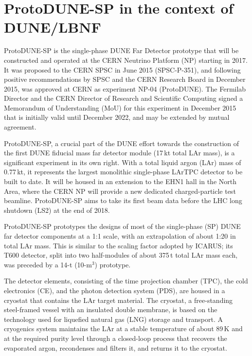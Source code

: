 
\section{ProtoDUNE-SP in the context of DUNE/LBNF}

ProtoDUNE-SP is the single-phase DUNE Far Detector prototype that will be constructed and operated at the CERN Neutrino Platform (NP) starting in 2017. It was proposed to the CERN SPSC in June 2015 (SPSC-P-351), and following positive recommendations by SPSC and the CERN Research Board in December 2015, was approved at CERN as experiment NP-04 (ProtoDUNE). The Fermilab Director and the CERN Director of Research and Scientific Computing signed a Memorandum of Understanding (MoU) for this experiment in December 2015 that is initially valid until December 2022, 
and may be extended by mutual agreement. 

ProtoDUNE-SP, a crucial part of the DUNE effort towards the construction of the first DUNE  fiducial mass far detector module (17\,kt total LAr mass), is a significant experiment in its own right. With a total liquid argon (LAr) mass of 0.77\,kt, it represents the largest monolithic single-phase LArTPC detector to be built to date.  
It will be housed in an extension to the EHN1 hall in the North Area, where the CERN NP will provide a new dedicated charged-particle test beamline. ProtoDUNE-SP aims to take its first beam data before the LHC long shutdown (LS2) at the end of 2018.

ProtoDUNE-SP prototypes the designs of most of the single-phase (SP) DUNE far detector components at a 1:1 scale, with an extrapolation of about 1:20 in total LAr mass. This is similar to the scaling factor adopted 
by ICARUS; its T600 detector, split into two half-modules of about 375\,t total LAr mass each, was preceded by a 14-t (10-m$^3$) prototype. 

The detector elements, consisting of the time projection chamber (TPC), the cold electronics (CE), and the photon detection system (PDS), are housed in a cryostat that contains the LAr target material. The cryostat, a free-standing steel-framed vessel with an insulated double membrane, is based on the technology used for liquefied natural gas (LNG) storage and transport. 
A cryogenics system maintains the LAr at a stable temperature of about 89\,K and at the required purity level  through a closed-loop process that recovers the evaporated argon, recondenses and filters it, and returns it to the cryostat. 

